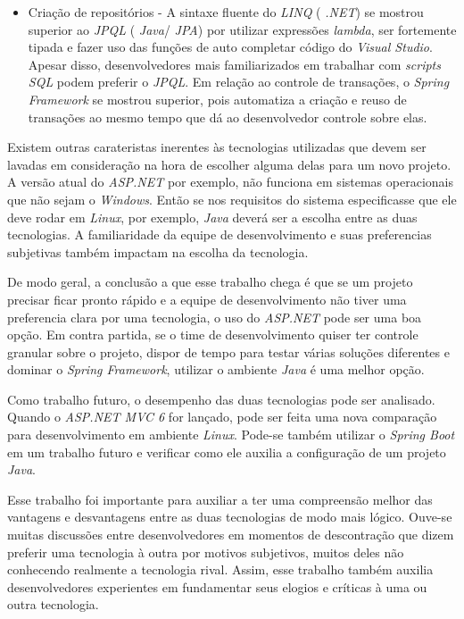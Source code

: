 \documentclass[a4paper,12pt]{article}
\newcommand{\est}[1] {
\textit{#1}}
\newcommand{\sigla}[1] {
\textit{#1}}
\newcommand{\lang}[1] {
\textit{#1}}
\begin{document}
\begin{itemize}
  \item Criação de repositórios - A sintaxe fluente do \lang{LINQ} (\sigla{.NET}) se mostrou superior ao \lang{JPQL} (\lang{Java}/\sigla{JPA}) por utilizar expressões \est{lambda}, ser fortemente tipada e fazer uso das funções de auto completar código do \est{Visual Studio}. Apesar disso, desenvolvedores mais familiarizados em trabalhar com \est{scripts} \lang{SQL} podem preferir o \lang{JPQL}. Em relação ao controle de transações, o \est{Spring Framework} se mostrou superior, pois automatiza a criação e reuso de transações ao mesmo tempo que dá ao desenvolvedor controle sobre elas. 
\end{itemize}

Existem outras carateristas inerentes às tecnologias utilizadas que devem ser lavadas em consideração na hora de escolher alguma delas para um novo projeto. A versão atual do \est{ASP.NET} por exemplo, não funciona em sistemas operacionais que não sejam o \est{Windows}. Então se nos requisitos do sistema especificasse que ele deve rodar em \est{Linux}, por exemplo, \lang{Java} deverá ser a escolha entre as duas tecnologias. A familiaridade da equipe de desenvolvimento e suas preferencias subjetivas também impactam na escolha da tecnologia.

De modo geral, a conclusão a que esse trabalho chega é que se um projeto precisar ficar pronto rápido e a equipe de desenvolvimento não tiver uma preferencia clara por uma tecnologia, o uso do \est{ASP.NET} pode ser uma boa opção. Em contra partida, se o time de desenvolvimento quiser ter controle granular sobre o projeto, dispor de tempo para testar várias soluções diferentes e dominar o \est{Spring Framework}, utilizar o ambiente \lang{Java} é uma melhor opção.

Como trabalho futuro, o desempenho das duas tecnologias pode ser analisado. Quando o \est{ASP.NET MVC 6} for lançado, pode ser feita uma nova comparação para desenvolvimento em ambiente \est{Linux}. Pode-se também utilizar o \est{Spring Boot} em um trabalho futuro e verificar como ele auxilia a configuração de um projeto \lang{Java}.

Esse trabalho foi importante para auxiliar a ter uma compreensão melhor das vantagens e desvantagens entre as duas tecnologias de modo mais lógico. Ouve-se muitas discussões entre desenvolvedores em momentos de descontração que dizem preferir uma tecnologia à outra por motivos subjetivos, muitos deles não conhecendo realmente a tecnologia rival. Assim, esse trabalho também auxilia desenvolvedores experientes em fundamentar seus elogios e críticas à uma ou outra tecnologia.
\end{document}

